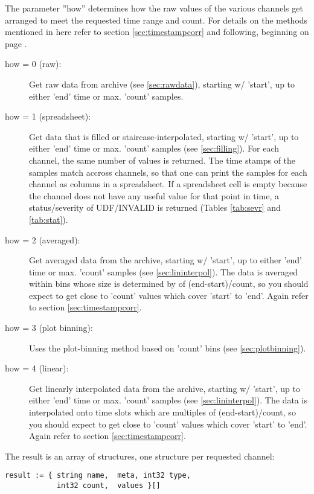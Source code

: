 \noindent The parameter ''how'' determines how the raw values of the
various channels get arranged to meet the requested time range and
count.  For details on the methods mentioned in here refer to section
\ref{sec:timestampcorr} and following, beginning on page
\pageref{sec:timestampcorr}.
\begin{description}
\item[\sffamily how = 0 (raw):]
  Get raw data from archive (see \ref{sec:rawdata}), starting w/ 'start',
  up to either 'end' time or max. 'count' samples.
\item[\sffamily how = 1 (spreadsheet):]
  Get data that is filled or staircase-interpolated, starting
  w/ 'start', up to either 'end' time or max. 'count' samples
  (see \ref{sec:filling}).
  For each channel, the same number of values is returned. The
  time stamps of the samples match accross channels, so that one can
  print the samples for each channel as columns in a spreadsheet.
  If a spreadsheet cell is empty because the channel does not have any
  useful value for that point in time, a status/severity of
  UDF/INVALID is returned (Tables \ref{tab:sevr} and \ref{tab:stat}).
\item[\sffamily how = 2 (averaged):]
  Get averaged data from the archive, starting w/ 'start',
  up to either 'end' time or max. 'count' samples
  (see \ref{sec:lininterpol}).
  The data is averaged within bins whose size is determined by 
  of (end-start)/count, so you should expect to get close to 'count'
  values which cover 'start' to 'end'.
  Again refer to section \ref{sec:timestampcorr}.
\item[\sffamily how = 3 (plot binning):]
  Uses the plot-binning method based on 'count' bins
  (see \ref{sec:plotbinning}).
\item[\sffamily how = 4 (linear):]
  Get linearly interpolated data from the archive, starting w/ 'start',
  up to either 'end' time or max. 'count' samples
  (see \ref{sec:lininterpol}).
  The data is interpolated onto time slots which are multiples
  of (end-start)/count, so you should expect to get close to 'count'
  values which cover 'start' to 'end'.
  Again refer to section \ref{sec:timestampcorr}.
\end{description}

\noindent The result is an array of structures,  one structure per
requested channel:

\begin{lstlisting}[keywordstyle=\sffamily]
result := { string name,  meta, int32 type,
            int32 count,  values }[]
\end{lstlisting}

